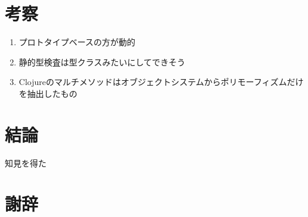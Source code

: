 \documentclass[a4paper,11pt,dvipdfmx]{jreport}
\begin{document}
\chapter{考察}

\begin{enumerate}
\item プロトタイプベースの方が動的
\item 静的型検査は型クラスみたいにしてできそう
\item Clojureのマルチメソッドはオブジェクトシステムからポリモーフィズムだけを抽出したもの
\end{enumerate}

\chapter{結論}

知見を得た

\chapter*{謝辞}

\newpage

\renewcommand{\bibname}{参考文献}




%
%
\end{document}

